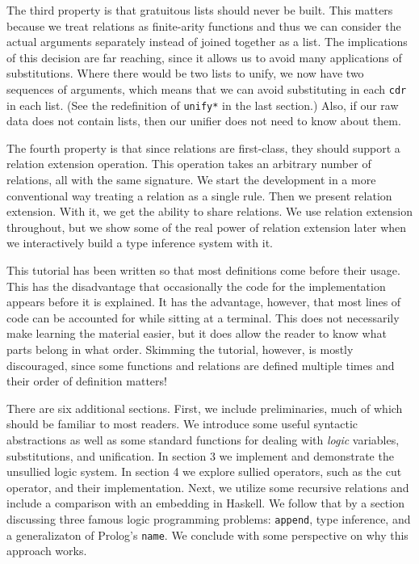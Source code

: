 The third property is that gratuitous lists should never be built.
This matters because we treat relations as finite-arity functions and
thus we can consider the actual arguments separately instead of joined
together as a list.  The implications of this decision are far
reaching, since it allows us to avoid many applications of
substitutions.  Where there would be two lists to unify, we now have
two sequences of arguments, which means that we can avoid substituting
in each \texttt{cdr} in each list. (See the redefinition of
\texttt{unify*} in the last section.)  Also, if our raw data does not
contain lists, then our unifier does not need to know about them.

The fourth property is that since relations are first-class, they
should support a relation extension operation.  This operation takes
an arbitrary number of relations, all with the same signature.  We
start the development in a more conventional way treating a relation
as a single rule.  Then we present relation extension.  With it, we
get the ability to share relations.  We use relation extension
throughout, but we show some of the real power of relation extension
later when we interactively build a type inference system with it.

This tutorial has been written so that most definitions come before
their usage.  This has the disadvantage that occasionally the code for
the implementation appears before it is explained.  It has the
advantage, however, that most lines of code can be accounted for while
sitting at a terminal.  This does not necessarily make learning the
material easier, but it does allow the reader to know what parts
belong in what order.  Skimming the tutorial, however, is mostly
discouraged, since some functions and relations are defined multiple
times and their order of definition matters!

There are six additional sections.  First, we include preliminaries, much
of which should be familiar to most readers.  We introduce some useful
syntactic abstractions as well as some standard functions for dealing with
\emph{logic} variables, substitutions, and unification.  In section 3 we
implement and demonstrate the unsullied logic system.  In section 4 we
explore sullied operators, such as the cut operator, and their
implementation. Next, we utilize some recursive relations and include a
comparison with an embedding in Haskell.  We follow that by a section
discussing three famous logic programming problems: \texttt{append}, type
inference, and a generalizaton of Prolog's \texttt{name}.  We conclude with
some perspective on why this approach works.

